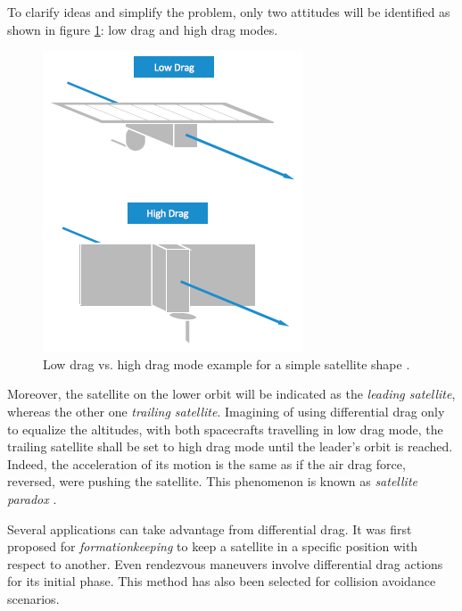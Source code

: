 To clarify ideas and simplify the problem, only two attitudes will be identified as shown in figure \ref{low_vs_high_dragmode_fig}: low drag and high drag modes.
\begin{figure}[h]
    \centering
    \includegraphics[scale=1]{img/low_vs_high_dragmode.png}
    \caption{Low drag vs. high drag mode example for a simple satellite shape \cite{foster2018differential}.}
    \label{low_vs_high_dragmode_fig}
\end{figure}
Moreover, the satellite on the lower orbit will be indicated as the \textit{leading satellite}, whereas the other one \textit{trailing satellite}.
Imagining of using differential drag only to equalize the altitudes, with both spacecrafts travelling in low drag mode, the trailing satellite shall be set to high drag mode until the leader's orbit is reached.
Indeed, the acceleration of its motion is the same as if the air drag force, reversed, were pushing the satellite. 
This phenomenon is known as \textit{satellite paradox} \cite{mills1959satellite}. 

Several applications can take advantage from differential drag. It was first proposed for \textit{formationkeeping} to keep a satellite in a specific position with respect to another.
Even rendezvous maneuvers involve differential drag actions for its initial phase.
This method has also been selected for collision avoidance scenarios.

